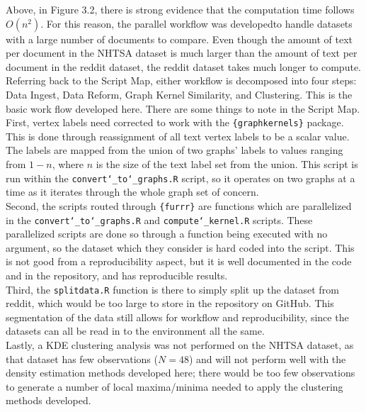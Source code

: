 Above, in Figure 3.2, there is strong evidence that the computation time follows $O(n^2)$. For this reason, the parallel workflow was developed\textemdash to handle datasets with a large number of documents to compare. Even though the amount of text per document in the NHTSA dataset is much larger than the amount of text per document in the reddit dataset, the reddit dataset takes much longer to compute. \\
Referring back to the Script Map, either workflow is decomposed into four steps: Data Ingest, Data Reform, Graph Kernel Similarity, and Clustering. This is the basic work flow developed here. There are some things to note in the Script Map.\\ 
First, vertex labels need corrected to work with the \texttt{\{graphkernels\}} package. This is done through reassignment of all text vertex labels to be a scalar value. The labels are mapped from the union of two graphs' labels to values ranging from $1-n$, where $n$ is the size of the text label set from the union. This script is run within the \texttt{convert\char`_to\char`_graphs.R} script, so it operates on two graphs at a time as it iterates through the whole graph set of concern.\\
Second, the scripts routed through \texttt{\{furrr\}} are functions which are parallelized in the \texttt{convert\char`_to\char`_graphs.R} and \texttt{compute\char`_kernel.R} scripts. These parallelized scripts are done so through a function being executed with no argument, so the dataset which they consider is hard coded into the script. This is not good from a reproducibility aspect, but it is well documented in the code and in the repository, and has reproducible results. \\
Third, the \texttt{splitdata.R} function is there to simply split up the dataset from reddit, which would be too large to store in the repository on GitHub. This segmentation of the data still allows for workflow and reproducibility, since the datasets can all be read in to the environment all the same. \\
Lastly, a KDE clustering analysis was not performed on the NHTSA dataset, as that dataset has few observations ($N=48$) and will not perform well with the density estimation methods developed here; there would be too few observations to generate a number of local maxima/minima needed to apply the clustering methods developed. \\

 